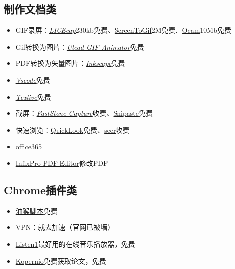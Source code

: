 \documentclass[UTF8,oneside]{ctexbook}
\begin{document}
\subsection{制作文档类}
\begin{itemize}
	\item GIF录屏：\underline{\textit{\href{https://www.cockos.com/licecap/}{LICEcap}}}\quad 230kb免费、\href{https://www.screentogif.com/?l=zh_cn}{ScreenToGif}\quad 2M免费、\href{https://ocam.en.softonic.com}{Ocam}\quad 10Mb免费
	\item Gif转换为图片：\underline{\textit{\href{https://ulead-gif-animator.jaleco.com}{Ulead GIF Animator}}}\quad 免费
	\item PDF转换为矢量图片：\underline{\textit{\href{https://inkscape.org}{Inkscape}}}\quad 免费
	\item \underline{\textit{\href{https://code.visualstudio.com}{Vscode}}}\quad 免费
	\item \underline{\textit{\href{https://mirrors.tuna.tsinghua.edu.cn/CTAN/systems/texlive/Images/}{Texlive}}}\quad 免费
	\item 截屏：\underline{\textit{\href{http://www.faststone.org/FSCaptureDetail.htm}{FastStone Capture}}}\quad 收费、\href{https://www.snipaste.com}{Snipaste}\quad 免费
	\item 快速浏览：\href{https://pooi.moe/QuickLook/}{QuickLook}\quad 免费、\href{http://1218.io}{seer}\quad 收费
	\item \href{https://otp.landian.vip/zh-cn/}{office365}
	\item \href{http://www.dayanzai.me/infixpro-pdf-editor.html}{InfixPro PDF Editor}\quad 修改PDF
\end{itemize}

\subsection{Chrome插件类}
\begin{itemize}
	\item \href{https://greasyfork.org/zh-CN}{油猴脚本}\quad 免费
	\item VPN：就去加速（官网已被墙）
	\item \href{http://listen1.github.io/listen1/}{Listen1}\quad 最好用的在线音乐播放器，免费
	\item \href{https://kopernio.com}{Kopernio}\quad 免费获取论文，免费
\end{itemize}
\end{document}
